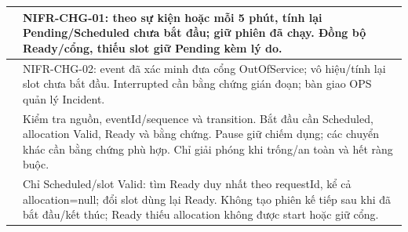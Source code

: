 \begin{longtable}{|L{58mm}|L{81mm}|}
 & NIFR-CHG-01: theo sự kiện hoặc mỗi 5 phút, tính lại Pending/Scheduled chưa bắt đầu; giữ phiên đã chạy. Đồng bộ Ready/cổng, thiếu slot giữ Pending kèm lý do.\\\hline
{} & NIFR-CHG-02: event đã xác minh đưa cổng OutOfService; vô hiệu/tính lại slot chưa bắt đầu. Interrupted cần bằng chứng gián đoạn; bàn giao OPS quản lý Incident.\\\hline
{} & Kiểm tra nguồn, eventId/sequence và transition. Bắt đầu cần Scheduled, allocation Valid, Ready và bằng chứng. Pause giữ chiếm dụng; các chuyển khác cần bằng chứng phù hợp. Chỉ giải phóng khi trống/an toàn và hết ràng buộc.\\\hline
{} & Chỉ Scheduled/slot Valid: tìm Ready duy nhất theo requestId, kể cả allocation=null; đổi slot dùng lại Ready. Không tạo phiên kế tiếp sau khi đã bắt đầu/kết thúc; Ready thiếu allocation không được start hoặc giữ cổng.\\\hline
\end{longtable}


